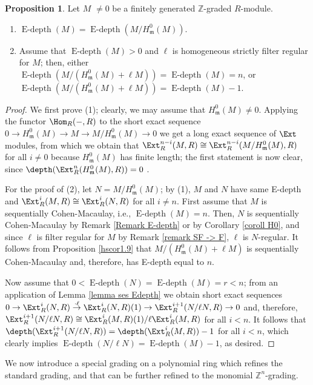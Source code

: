 \documentclass[12pt]{amsart}
\theoremstyle{definition}
\newtheorem{proposition}[theorem]{Proposition}
\theoremstyle{definition}
\newcommand{\m}{\mathfrak{m}}
\def\NZQ{\mathbb}               %
\def\ZZ{{\NZQ Z}}
\let\lra\longrightarrow
\DeclareMathOperator{\Edepth}{E-depth}
\begin{document}
\begin{proposition} \label{prop Edepth} Let $M$ $\neq 0$ be a finitely generated $\ZZ$-graded $R$-module.
\begin{enumerate}[(1)]
\item $\Edepth(M) = \Edepth(M/H^0_\m(M))$.
\item Assume that $\Edepth(M)>0$  and $\ell$ is  homogeneous strictly filter regular for $M$; then, either $\Edepth(M/(H^0_\m(M)+\ell M)) = \Edepth(M)=n$, or $\Edepth(M/(H^0_\m(M)+\ell M)) = \Edepth(M)-1$.
\end{enumerate}
\end{proposition}
\begin{proof}
We first prove (1); clearly, we may assume that $H^0_\m(M) \ne 0$. Applying the functor $\Hom_R(-,R)$ to the short exact sequence $0 \lra H^0_\m(M) \lra M \lra M/H^0_\m(M) \lra 0$ we get a long exact sequence of $\Ext$ modules, from which we obtain that $\Ext^{n-i}_R(M,R) \cong \Ext^{n-i}_R(M/H^0_\m(M),R)$ for all $i \ne 0$ because $H^0_\m(M)$ has finite length; the first statement is now clear, since  $\depth(\Ext^n_R(H^0_\m(M),R))=0$ .

\medskip
For the proof of (2), let $N=M/H^0_\m(M)$; by (1), $M$ and $N$ have same E-depth and $\Ext^{i}_R(M,R) \cong \Ext^{i}_R(N,R)$ for all $i\neq n$. First assume that $M$ is sequentially Cohen-Macaulay, i.e., $\Edepth(M)=n$. Then, $N$ is sequentially Cohen-Macaulay by Remark \ref{Remark E-depth}  or by Corollary \ref{coroll H0}, and since $\ell$ is filter regular for $M$ by Remark \ref{remark SF -> F}, $\ell$ is $N$-regular. It follows from  Proposition \ref{hscor1.9} that $M/(H^0_\m(M) + \ell M)$ is sequentially Cohen-Macaulay and, therefore, has E-depth equal to $n$.

\noindent Now assume that $0<\Edepth(N)=\Edepth(M) = r<n$; from an application of  Lemma \ref{lemma ses Edepth}  we obtain short exact sequences $0 \to \Ext^i_R(N,R) \stackrel{\cdot \ell}{\to} \Ext^i_R(N,R)(1) \to \Ext^{i+1}_R(N/\ell N,R) \to 0$  and,   therefore, $\Ext^{i+1}_R(N/\ell N,R) \cong \Ext^i_R(M,R)(1)/\ell \Ext^i_R(M,R)$ for all $i<n$. It follows that $\depth(\Ext^{i+1}_R(N/\ell N,R)) = \depth(\Ext^i_R(M,R))-1$ for all $i<n$, which clearly implies  $\Edepth(N/\ell N) = \Edepth(M)-1$, as desired.
\end{proof}


We now introduce a special grading on a polynomial ring  which refines the standard grading, and that can be further refined to the monomial $\ZZ^n$-grading.
\end{document}
